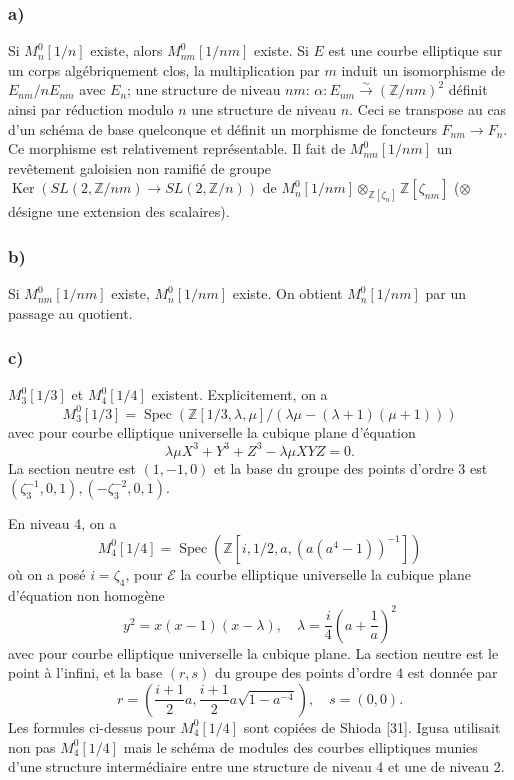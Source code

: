 \documentclass{amsart}
\theoremstyle{plain}
\theoremstyle{remark}
\DeclareMathOperator{\Spec}{Spec}
\DeclareMathOperator{\Ker}{Ker}
\newcommand{\bbZ}{\mathbb{Z}}
\begin{document}
\subsubsection*{a)}
Si $M_n^0[1/n]$ existe, alors $M_{nm}^0[1/nm]$ existe. Si $E$ est une courbe elliptique sur un corps alg\'ebriquement clos, la multiplication par $m$ induit un isomorphisme de $E_{nm}/nE_{nm}$ avec $E_n$; une structure de niveau $nm$: $\alpha: E_{nm} \xrightarrow{\sim} (\bbZ/nm)^2$ d\'efinit ainsi par r\'eduction modulo $n$ une structure de niveau $n$. Ceci se transpose au cas d'un sch\'ema de base quelconque et d\'efinit un morphisme de foncteurs $F_{nm} \to F_n$. Ce morphisme est relativement repr\'esentable. Il fait de $M_{nm}^0[1/nm]$ un rev\^etement galoisien non ramifi\'e de groupe $\Ker(SL(2,\bbZ/nm) \to SL(2,\bbZ/n))$ de $M_n^0[1/nm] \otimes_{\bbZ[\zeta_n]} \bbZ[\zeta_{nm}]$ ($\otimes$ d\'esigne une extension des scalaires).

\subsubsection*{b)}
Si $M_{nm}^0[1/nm]$ existe, $M_n^0[1/nm]$ existe. On obtient $M_n^0[1/nm]$ par un passage au quotient.

\subsubsection*{c)}
$M_3^0[1/3]$ et $M_4^0[1/4]$ existent. Explicitement, on a
\[
M_3^0[1/3] = \Spec(\bbZ[1/3,\lambda,\mu]/(\lambda\mu - (\lambda+1)(\mu+1)))
\]
avec pour courbe elliptique universelle la cubique plane d'\'equation
\[
\lambda\mu X^3 + Y^3 + Z^3 - \lambda\mu XYZ = 0.
\]
La section neutre est $(1,-1,0)$ et la base du groupe des points d'ordre 3 est $(\zeta_3^{-1},0,1), (-\zeta_3^{-2},0,1)$.

En niveau 4, on a
\[
M_4^0[1/4] = \Spec(\bbZ[i,1/2,a,(a(a^4-1))^{-1}])
\]
o\`u on a pos\'e $i = \zeta_4$, pour $\mathscr{E}$ la courbe elliptique universelle la cubique plane d'\'equation non homog\`ene
\[
y^2 = x(x-1)(x-\lambda), \quad \lambda = \frac{i}{4}\left(a + \frac{1}{a}\right)^2
\]
avec pour courbe elliptique universelle la cubique plane. La section neutre est le point \`a l'infini, et la base $(r,s)$ du groupe des points d'ordre 4 est donn\'ee par
\[
r = \left(\frac{i+1}{2}a, \frac{i+1}{2}a\sqrt{1-a^{-4}}\right), \quad s = (0,0).
\]
Les formules ci-dessus pour $M_4^0[1/4]$ sont copi\'ees de Shioda [31]. Igusa utilisait non pas $M_4^0[1/4]$ mais le sch\'ema de modules des courbes elliptiques munies d'une structure interm\'ediaire entre une structure de niveau 4 et une de niveau 2.
\end{document}
